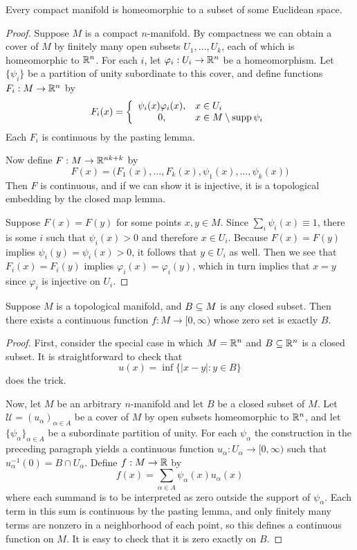 \begin{theorem}
Every compact manifold is homeomorphic to a subset of some Euclidean space.
\end{theorem}
\begin{proof}
Suppose $M$ is a compact $n$-manifold. By compactness we can obtain a cover of $M$ by finitely many open subsets $U_1,\dots,U_k$, each of which is homeomorphic to $\mathbb{R}^n$. For each $i$, let $\varphi_i:U_i\to\mathbb{R}^n$ be a homeomorphism. Let $\{\psi_i\}$ be a partition of unity subordinate to this cover, and define functions $F_i:M\to \mathbb{R}^n$ by
\[F_i(x)=\left\{\begin{array}{cl}
\psi_i(x)\varphi_i(x), &x\in U_i\\
0, &x\in M\setminus \mathrm{supp}\,\psi_i
\end{array}\right. \]
Each $F_i$ is continuous by the pasting lemma.\par
Now define $F:M\to \mathbb{R}^{nk+k}$ by
\[F(x)=\big(F_1(x),\dots,F_k(x),\psi_1(x),\dots,\psi_k(x)\big)\] 
Then $F$ is continuous, and if we can show it is injective, it is a topological embedding
by the closed map lemma.\par
Suppose $F(x)=F(y)$ for some points $x,y\in M$. Since $\sum_i\psi_i(x)\equiv1$, there is some $i$ such that $\psi_i(x)>0$ and therefore $x\in U_i$. Because $F(x)=F(y)$ implies $\psi_i(y)=\psi_i(x)>0$, it follows that $y\in U_i$ as well. Then we see that $F_i(x)=F_i(y)$ implies $\varphi_i(x)=\varphi_i(y)$, which in turn implies that $x=y$ since $\varphi_i$ is injective on $U_i$.
\end{proof}
\begin{theorem}
Suppose $M$ is a topological manifold, and $B\subseteq M$ is any closed subset. Then there exists a continuous function $f:M\to[0,\infty)$ whose zero set is exactly $B$.
\end{theorem}
\begin{proof}
First, consider the special case in which $M=\mathbb{R}^n$ and $B\subseteq\mathbb{R}^n$ is a closed subset. It is straightforward to check that
\[u(x)=\inf\{|x-y|:y\in B\}\]
does the trick.\par
Now, let $M$ be an arbitrary $n$-manifold and let $B$ be a closed subset of $M$. Let $\mathcal{U}=(u_\alpha)_{\alpha\in A}$ be a cover of $M$ by open subsets homeomorphic to $\mathbb{R}^n$, and
let $\{\psi_\alpha\}_{\alpha\in A}$ be a subordinate partition of unity. For each $\psi_\alpha$ the construction in the preceding paragraph yields a continuous function $u_\alpha:U_\alpha\to [0,\infty)$ such that $u_\alpha^{-1}(0)=B\cap U_\alpha$. Define $f:M\to \mathbb{R}$ by
\[f(x)=\sum_{\alpha\in A}\psi_\alpha(x)u_\alpha(x)\]
where each summand is to be interpreted as zero outside the support of $\psi_\alpha$. Each term in this sum is continuous by the pasting lemma, and only finitely many terms are nonzero in a neighborhood of each point, so this defines a continuous function on $M$. It is easy to check that it is zero exactly on $B$.
\end{proof}
